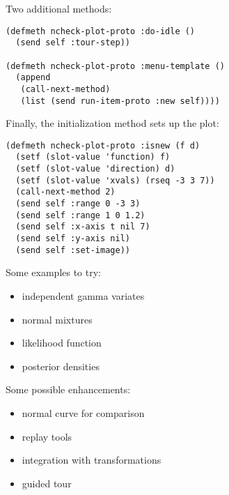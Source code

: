 \begin{slide}{}
Two additional methods:
{\Large
\begin{verbatim}
(defmeth ncheck-plot-proto :do-idle ()
  (send self :tour-step))

(defmeth ncheck-plot-proto :menu-template ()
  (append
   (call-next-method)
   (list (send run-item-proto :new self))))
\end{verbatim}}
Finally, the initialization method sets up the plot:
{\Large
\begin{verbatim}
(defmeth ncheck-plot-proto :isnew (f d)
  (setf (slot-value 'function) f)
  (setf (slot-value 'direction) d)
  (setf (slot-value 'xvals) (rseq -3 3 7))
  (call-next-method 2)
  (send self :range 0 -3 3)
  (send self :range 1 0 1.2)
  (send self :x-axis t nil 7)
  (send self :y-axis nil)
  (send self :set-image))
\end{verbatim}}
\end{slide}

\begin{slide}{}
Some examples to try:
\begin{itemize}
\item independent gamma variates
\item normal mixtures
\item likelihood function
\item posterior densities
\end{itemize}
Some possible enhancements:
\begin{itemize}
\item normal curve for comparison
\item replay tools
\item integration with transformations
\item guided tour
\end{itemize}
\end{slide}

